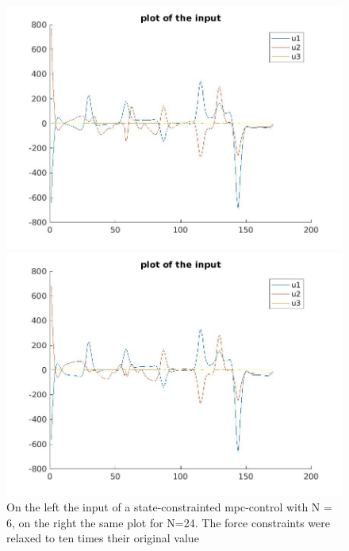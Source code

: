 \documentclass[•]{article}
\begin{document}
\begin{figure}[H]
\begin{minipage}{.45\textwidth}
\includegraphics[width = \textwidth]{mpcinputforce6.jpg}
\end{minipage}
\begin{minipage}{.45\textwidth}
\includegraphics[width = \textwidth]{mpcinputforce24.jpg}
\end{minipage}
\caption{On the left the input of a state-constrainted mpc-control with N = 6, on the right the same plot for N=24. The force constraints were relaxed to ten times their original value}
\end{figure}
\end{document}
